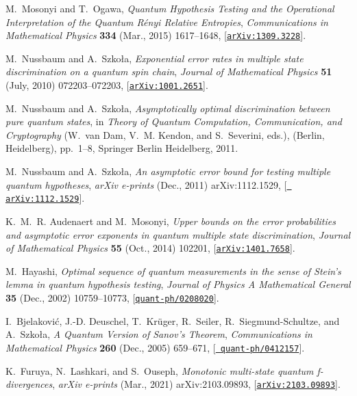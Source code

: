 \documentclass[a4paper,11pt]{article}
\begin{document}
\begin{thebibliography}{100}
M.~{Mosonyi} and T.~{Ogawa}, {\it {Quantum Hypothesis Testing and the
  Operational Interpretation of the Quantum R{\'e}nyi Relative Entropies}},
  {\em Communications in Mathematical Physics} {\bf 334} (Mar., 2015)
  1617--1648, [\href{http://arxiv.org/abs/1309.3228}{{\tt arXiv:1309.3228}}].

M.~{Nussbaum} and A.~{Szko{\l}a}, {\it {Exponential error rates in multiple
  state discrimination on a quantum spin chain}},  {\em Journal of Mathematical
  Physics} {\bf 51} (July, 2010) 072203--072203,
  [\href{http://arxiv.org/abs/1001.2651}{{\tt arXiv:1001.2651}}].

M.~Nussbaum and A.~Szko{\l}a, {\it Asymptotically optimal discrimination
  between pure quantum states},  in {\em Theory of Quantum Computation,
  Communication, and Cryptography} (W.~van Dam, V.~M. Kendon, and S.~Severini,
  eds.), (Berlin, Heidelberg), pp.~1--8, Springer Berlin Heidelberg, 2011.

M.~{Nussbaum} and A.~{Szko{\l}a}, {\it {An asymptotic error bound for testing
  multiple quantum hypotheses}},  {\em arXiv e-prints} (Dec., 2011)
  arXiv:1112.1529, [\href{http://arxiv.org/abs/1112.1529}{{\tt
  arXiv:1112.1529}}].

K.~M.~R. {Audenaert} and M.~{Mosonyi}, {\it {Upper bounds on the error
  probabilities and asymptotic error exponents in quantum multiple state
  discrimination}},  {\em Journal of Mathematical Physics} {\bf 55} (Oct.,
  2014) 102201, [\href{http://arxiv.org/abs/1401.7658}{{\tt arXiv:1401.7658}}].

M.~{Hayashi}, {\it {Optimal sequence of quantum measurements in the sense of
  Stein's lemma in quantum hypothesis testing}},  {\em Journal of Physics A
  Mathematical General} {\bf 35} (Dec., 2002) 10759--10773,
  [\href{http://arxiv.org/abs/quant-ph/0208020}{{\tt quant-ph/0208020}}].

I.~{Bjelakovi{\'c}}, J.-D. {Deuschel}, T.~{Kr{\"u}ger}, R.~{Seiler},
  R.~{Siegmund-Schultze}, and A.~{Szko{\l}a}, {\it {A Quantum Version of
  Sanov's Theorem}},  {\em Communications in Mathematical Physics} {\bf 260}
  (Dec., 2005) 659--671, [\href{http://arxiv.org/abs/quant-ph/0412157}{{\tt
  quant-ph/0412157}}].

K.~{Furuya}, N.~{Lashkari}, and S.~{Ouseph}, {\it {Monotonic multi-state
  quantum f-divergences}},  {\em arXiv e-prints} (Mar., 2021) arXiv:2103.09893,
  [\href{http://arxiv.org/abs/2103.09893}{{\tt arXiv:2103.09893}}].


\end{thebibliography}
\end{document}
